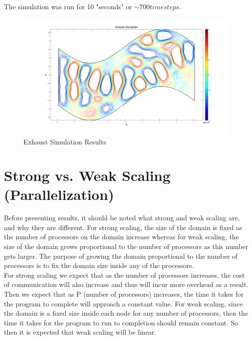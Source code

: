 \documentclass{article}
\begin{document}
The simulation was run for 10 "seconds" or \(\sim700 timesteps\).
\begin{figure}[h]
\caption{Exhaust Simulation Results}
\centering
\includegraphics[width=1.0\textwidth]{exhaust_sim_10}
\end{figure}
 


\section{Strong vs. Weak Scaling (Parallelization)}

Before presenting results, it should be noted what strong and weak scaling are, and why they are different. For strong scaling, the size of the domain is fixed as the number of processors on the domain increase whereas for weak scaling, the size of the domain grows proportional to the number of processors as this number gets larger. The purpose of growing the domain proportional to the number of processors is to fix the domain size inside any of the processors. 
\\
For strong scaling we expect that as the number of processors increases, the cost of communication will also increase and thus will incur more overhead as a result. Then we expect that as P (number of processors) increases, the time it takes for the program to complete will approach a constant value. For weak scaling, since the domain is a fixed size inside each node for any number of processors, then the time it takes for the program to run to completion should remain constant. So then it is expected that weak scaling will be linear.
\end{document}
